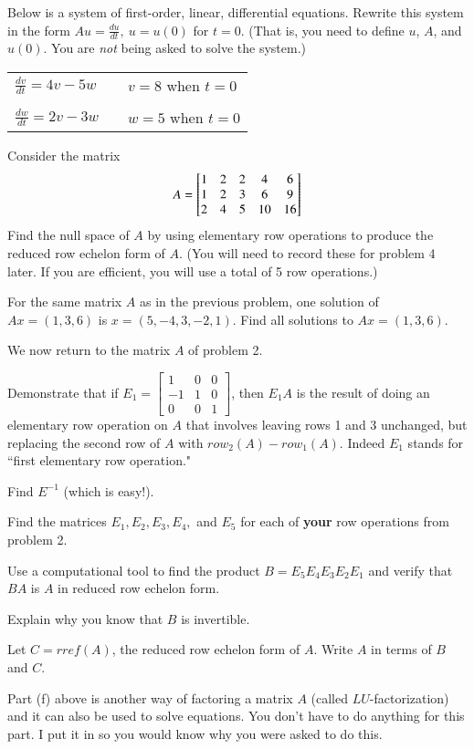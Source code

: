 \documentclass[minion]{homework}
\newcommand{\bbm}{\begin{bmatrix}}
\newcommand{\ebm}{\end{bmatrix}}
\begin{document}
\begin{problems}

\problem Below is a system of first-order, linear, differential equations. Rewrite this system in the form $Au=\frac{du}{dt}, \: u=u(0)$ for $t=0.$ (That is, you need to define $u$, $A$, and $u(0).$ You are \emph{not} being asked to solve the system.)

\begin{tabular}{lll}
$\frac{dv}{dt}=4v-5w$&\quad& $v=8$ when $t=0$\\
&&\\
$\frac{dw}{dt}=2v-3w$&\quad& $w=5$ when $t=0$\\
\end{tabular}

    \problem Consider the matrix 
    \[
A = \begin{bmatrix}
    1 &2 &2 &4 & 6\cr
    1 &2 &3 &6 &9\cr
    2 &4 &5 &10 &16   
\end{bmatrix}
\]
Find the null space of $A$ by using elementary row operations to produce the reduced row echelon form of $A.$ (You will need to record these for problem 4 later. If you are efficient, you will use a total of 5 row operations.)
 
 \problem For the same matrix $A$ as in the previous problem,
    one solution of $Ax=(1,3,6)$ is $x=(5,-4,3,-2,1)$.  Find
    all solutions to $Ax=(1,3,6).$

 \problem We now return to the matrix $A$ of problem 2. 
	\begin{subproblems}
	\item Demonstrate that if $E_1=\bbm 1&0&0\\-1&1&0\\0&0&1\ebm$, then $E_1A$ is the result of doing an elementary row operation on $A$ that involves leaving rows 1 and 3 unchanged, but replacing the second row of $A$ with $row_2(A)-row_1(A)$. Indeed $E_1$ stands for ``first elementary row operation."
	\item Find $E^{-1}$ (which is easy!). 
	\item Find the matrices $E_1,E_2,E_3,E_4,$ and $E_5$ for each of \textbf{your} row operations from problem 2.
	\item Use a computational tool to find the product $B=E_5E_4E_3E_2E_1$ and verify that $BA$ is $A$ in reduced row echelon form.
	\item Explain why you know that $B$ is invertible.
	\item Let $C=rref(A)$, the reduced row echelon form of $A.$ Write $A$ in terms of $B$ and $C.$ 
	\item Part (f) above is another way of factoring a matrix $A$ (called $LU$-factorization) and it can also be used to solve equations. You don't have to do anything for this part. I put it in so you would know why you were asked to do this.
	\end{subproblems}


\end{problems}
\end{document}
